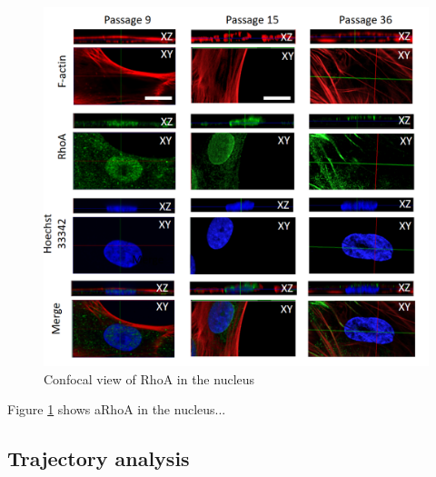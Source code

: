 \documentclass[english,authoryear]{elsarticle}
\begin{document}
\begin{figure}
  \includegraphics[width=0.9\linewidth]{fig_rho-3d.png}
  \caption{Confocal view of RhoA in the nucleus}
  \label{rho-3d}
  \centering
\end{figure}


Figure \ref{rho-3d} shows aRhoA in the nucleus...


\subsection{Trajectory analysis}
\end{document}

